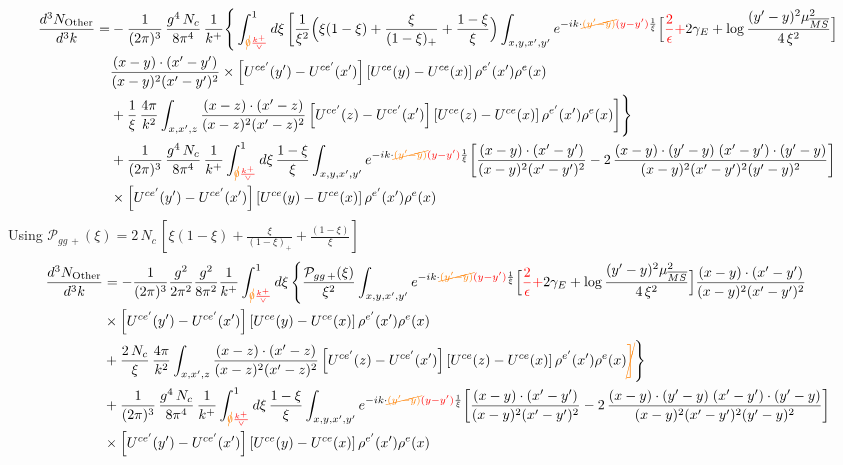 \documentclass[9pt]{article}
\numberwithin{equation}{section}
\begin{document}
\begin{align}
\frac{d^{3}N_{\rm Other}}{d^{3}k}= &-\frac{1}{(2\pi)^{3}}\,\frac{g^{4}\,N_{c}}{8\pi^{4}}\,\frac{1}{k^{+}}\Bigg\{\int_{{\color{orange}\cancel{0}}{\color{red}\frac{k^{+}}{\vee}}}^{1}d\xi\,\bigg[\frac{1}{\xi^{2}}\Big(\xi(1-\xi)+\frac{\xi}{(1-\xi)_{+}}+\frac{1-\xi}{\xi}\Big)\int_{x,y,x',y'}e^{-ik\cdot{\color{orange}\cancel{(y'-y)}}{\color{red}(y-y')}\frac{1}{\xi}}\Big[{\color{red}\frac{2}{\epsilon}+}2\gamma_{E}+\log\frac{(y'-y)^{2}\mu^{2}_{\overline{MS}}}{4\,\xi^{2}}\Big]\notag \\ & \frac{(x-y)\cdot(x'-y')}{(x-y)^{2}(x'-y')^{2}}\times\left[U^{ce'}(y') - U^{ce'}(x')\right]\left[U^{ce}(y) - U^{ce}(x)\right]\rho^{e'}(x')\rho^{e}(x)\notag\\
&+\frac{1}{\xi}\,\frac{4\pi}{k^{2}}\int_{x,x',z}\frac{(x-z)\cdot(x'-z)}{(x-z)^{2}(x'-z)^{2}}\left[U^{ce'}(z) - U^{ce'}(x')\right]\left[U^{ce}(z) - U^{ce}(x)\right]\rho^{e'}(x')\rho^{e}(x)\bigg]\Bigg\}\notag\\
&+\frac{1}{(2\pi)^{3}}\,\frac{g^{4}\,N_{c}}{8\pi^{4}}\,\frac{1}{k^{+}}\int_{{\color{orange}\cancel{0}}{\color{red}\frac{k^{+}}{\vee}}}^{1}d\xi\,\frac{1-\xi}{\xi}\int_{x,y,x',y'}e^{-ik\cdot{\color{orange}\cancel{(y'-y)}}{\color{red}(y-y')}\frac{1}{\xi}}\bigg[\frac{(x-y)\cdot(x'-y')}{(x-y)^{2}(x'-y')^{2}}-2\,\frac{(x-y)\cdot(y'-y)\;(x'-y')\cdot(y'-y)}{(x-y)^{2}(x'-y')^{2}(y'-y)^{2}}\bigg]\notag\\
&\times\left[U^{ce'}(y') - U^{ce'}(x')\right]\left[U^{ce}(y) - U^{ce}(x)\right]\rho^{e'}(x')\rho^{e}(x)
\end{align}
Using $\mathcal P_{gg\,+}(\xi) =  2\,N_{c}\,\left[\xi(1-\xi) + \frac{\xi}{(1-\xi)_{+}} + \frac{(1-\xi)}{\xi}\right]$
\begin{align}
\frac{d^{3}N_{\rm Other}}{d^{3}k} & = -\frac{1}{(2\pi)^{3}}\frac{g^{2}}{2\pi^{2}}\frac{g^{2}}{8\pi^{2}}\frac{1}{k^{+}}\int_{{\color{orange}\cancel{0}}{\color{red}\frac{k^{+}}{\vee}}}^{1}d\xi\,\Bigg\{\frac{\mathcal P_{gg\,+}(\xi)}{\xi^{2}}\int_{x,y,x',y'}e^{-ik\cdot{\color{orange}\cancel{(y'-y)}}{\color{red}(y-y')}\frac{1}{\xi}}\Big[{\color{red}\frac{2}{\epsilon}+}2\gamma_{E}+\log\frac{(y'-y)^{2}\mu^{2}_{\overline{MS}}}{4\,\xi^{2}}\Big]\frac{(x-y)\cdot(x'-y')}{(x-y)^{2}(x'-y')^{2}}\notag\\
&\times\left[U^{ce'}(y') - U^{ce'}(x')\right]\left[U^{ce}(y) - U^{ce}(x)\right]\rho^{e'}(x')\rho^{e}(x) \notag\\
&+\frac{2\,N_{c}}{\xi}\,\frac{4\pi}{k^{2}}\int_{x,x',z}\frac{(x-z)\cdot(x'-z)}{(x-z)^{2}(x'-z)^{2}}\left[U^{ce'}(z) - U^{ce'}(x')\right]\left[U^{ce}(z) - U^{ce}(x)\right]\rho^{e'}(x')\rho^{e}(x){\color{orange}\cancel{\bigg]}}\Bigg\}\notag\\
&+\frac{1}{(2\pi)^{3}}\,\frac{g^{4}\,N_{c}}{8\pi^{4}}\,\frac{1}{k^{+}}\int_{{\color{orange}\cancel{0}}{\color{red}\frac{k^{+}}{\vee}}}^{1}d\xi\,\frac{1-\xi}{\xi}\int_{x,y,x',y'}e^{-ik\cdot{\color{orange}\cancel{(y'-y)}}{\color{red}(y-y')}\frac{1}{\xi}}\bigg[\frac{(x-y)\cdot(x'-y')}{(x-y)^{2}(x'-y')^{2}}-2\,\frac{(x-y)\cdot(y'-y)\;(x'-y')\cdot(y'-y)}{(x-y)^{2}(x'-y')^{2}(y'-y)^{2}}\bigg]\notag\\
&\times\left[U^{ce'}(y') - U^{ce'}(x')\right]\left[U^{ce}(y) - U^{ce}(x)\right]\rho^{e'}(x')\rho^{e}(x)
\end{align}
\end{document}
